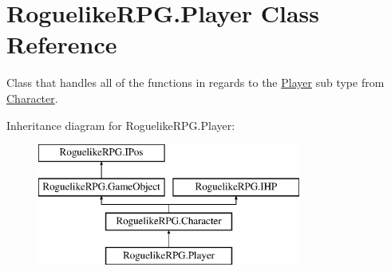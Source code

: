 \hypertarget{class_roguelike_r_p_g_1_1_player}{}\section{Roguelike\+R\+P\+G.\+Player Class Reference}
\label{class_roguelike_r_p_g_1_1_player}


Class that handles all of the functions in regards to the \mbox{\hyperlink{class_roguelike_r_p_g_1_1_player}{Player}} sub type from \mbox{\hyperlink{class_roguelike_r_p_g_1_1_character}{Character}}.  


Inheritance diagram for Roguelike\+R\+P\+G.\+Player\+:\begin{figure}[H]
\begin{center}
\leavevmode
\includegraphics[height=4.000000cm]{class_roguelike_r_p_g_1_1_player}
\end{center}
\end{figure}
